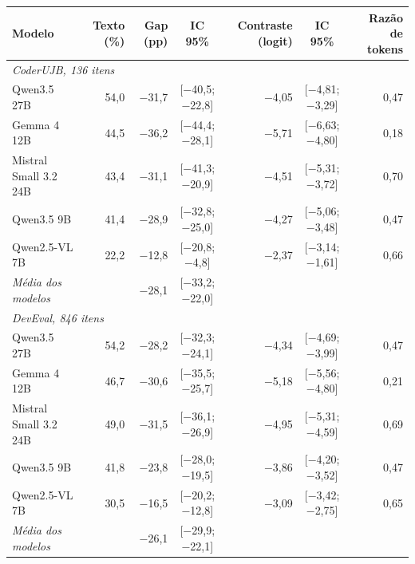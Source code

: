 \begin{tabular}{lrrcrcr}
\toprule
Modelo & Texto (\%) & Gap (pp) & IC 95\% & Contraste (logit) & IC 95\% & Razão de tokens \\
\midrule
\multicolumn{7}{l}{\emph{CoderUJB, 136 itens}} \\
Qwen3.5 27B & 54,0 & \ensuremath{-}31,7 & [\ensuremath{-}40,5; \ensuremath{-}22,8] & \ensuremath{-}4,05 & [\ensuremath{-}4,81; \ensuremath{-}3,29] & 0,47 \\
Gemma 4 12B & 44,5 & \ensuremath{-}36,2 & [\ensuremath{-}44,4; \ensuremath{-}28,1] & \ensuremath{-}5,71 & [\ensuremath{-}6,63; \ensuremath{-}4,80] & 0,18 \\
Mistral Small 3.2 24B & 43,4 & \ensuremath{-}31,1 & [\ensuremath{-}41,3; \ensuremath{-}20,9] & \ensuremath{-}4,51 & [\ensuremath{-}5,31; \ensuremath{-}3,72] & 0,70 \\
Qwen3.5 9B & 41,4 & \ensuremath{-}28,9 & [\ensuremath{-}32,8; \ensuremath{-}25,0] & \ensuremath{-}4,27 & [\ensuremath{-}5,06; \ensuremath{-}3,48] & 0,47 \\
Qwen2.5-VL 7B & 22,2 & \ensuremath{-}12,8 & [\ensuremath{-}20,8; \ensuremath{-}4,8] & \ensuremath{-}2,37 & [\ensuremath{-}3,14; \ensuremath{-}1,61] & 0,66 \\
\emph{Média dos modelos} &  & \ensuremath{-}28,1 & [\ensuremath{-}33,2; \ensuremath{-}22,0] &  &  &  \\
\midrule
\multicolumn{7}{l}{\emph{DevEval, 846 itens}} \\
Qwen3.5 27B & 54,2 & \ensuremath{-}28,2 & [\ensuremath{-}32,3; \ensuremath{-}24,1] & \ensuremath{-}4,34 & [\ensuremath{-}4,69; \ensuremath{-}3,99] & 0,47 \\
Gemma 4 12B & 46,7 & \ensuremath{-}30,6 & [\ensuremath{-}35,5; \ensuremath{-}25,7] & \ensuremath{-}5,18 & [\ensuremath{-}5,56; \ensuremath{-}4,80] & 0,21 \\
Mistral Small 3.2 24B & 49,0 & \ensuremath{-}31,5 & [\ensuremath{-}36,1; \ensuremath{-}26,9] & \ensuremath{-}4,95 & [\ensuremath{-}5,31; \ensuremath{-}4,59] & 0,69 \\
Qwen3.5 9B & 41,8 & \ensuremath{-}23,8 & [\ensuremath{-}28,0; \ensuremath{-}19,5] & \ensuremath{-}3,86 & [\ensuremath{-}4,20; \ensuremath{-}3,52] & 0,47 \\
Qwen2.5-VL 7B & 30,5 & \ensuremath{-}16,5 & [\ensuremath{-}20,2; \ensuremath{-}12,8] & \ensuremath{-}3,09 & [\ensuremath{-}3,42; \ensuremath{-}2,75] & 0,65 \\
\emph{Média dos modelos} &  & \ensuremath{-}26,1 & [\ensuremath{-}29,9; \ensuremath{-}22,1] &  &  &  \\
\bottomrule
\end{tabular}
